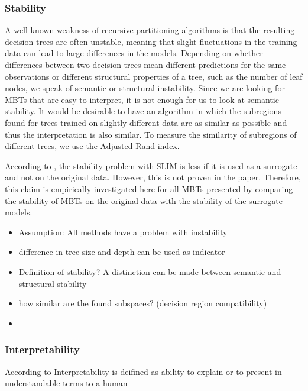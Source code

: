 \subsubsection{Stability}
A well-known weakness of recursive partitioning algorithms is that the resulting decision trees are often unstable, meaning that slight fluctuations in the training data can lead to large differences in the models\citep{Fokkema.2020}.
Depending on whether differences between two decision trees mean different predictions for the same observations or different structural properties of a tree, such as the number of leaf nodes, we speak of semantic or structural instability.\citep{Wang.2018}
Since we are looking for MBTs that are easy to interpret, it is not enough for us to look at semantic stability. It would be desirable to have an algorithm in which the subregions found for trees trained on slightly different data are as similar as possible and thus the interpretation is also similar.
To measure the similarity of subregions of different trees, we use the Adjusted Rand index.



According to \citep{Hu.2020}, the stability problem with SLIM is less if it is used as a surrogate and not on the original data. However, this is not proven in the paper. Therefore, this claim is empirically investigated here for all MBTs presented by comparing the stability of MBTs on the original data with the stability of the surrogate models.


\begin{itemize}
    \item Assumption: All methods have a problem with instability \citep{Fokkema.2020}
    \item difference in tree size and depth can be used as indicator \citep{Wang.2018}
    \item Definition of stability? A distinction can be made between semantic and structural stability \citep{Wang.2018}
    \item how similar are the found subspaces? (decision region compatibility) \citep{Wang.2018}

    \item 




\end{itemize}






\subsubsection{Interpretability}
According to \citet{DoshiVelez.2017} Interpretability is deifined as ability to explain or to present in understandable
terms to a human


